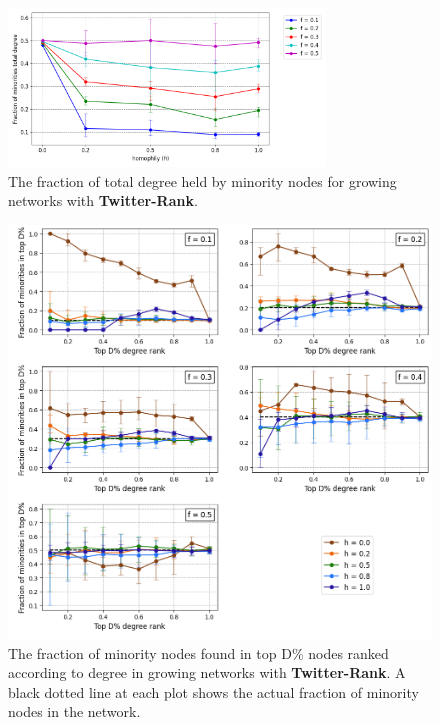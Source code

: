 \begin{figure}
	\centering
	\includegraphics[trim=0 5 0 10, clip, width=0.75\textwidth]{images/mf_growth_tr.png}
	\caption{The fraction of total degree held by minority nodes for growing networks with \textbf{Twitter-Rank}.}
	\label{mf_growth_tr_fig}
\end{figure}

\begin{figure}[h!]
	\centering
	\includegraphics[trim=0 10 0 5, clip, width=1.0\textwidth]{images/top_growth_tr.png}
	\caption{The fraction of minority nodes found in top D\% nodes ranked according to degree in growing networks with \textbf{Twitter-Rank}. A black dotted line at each plot shows the actual fraction of minority nodes in the network.}
	\label{top_growth_tr_fig}
\end{figure}

